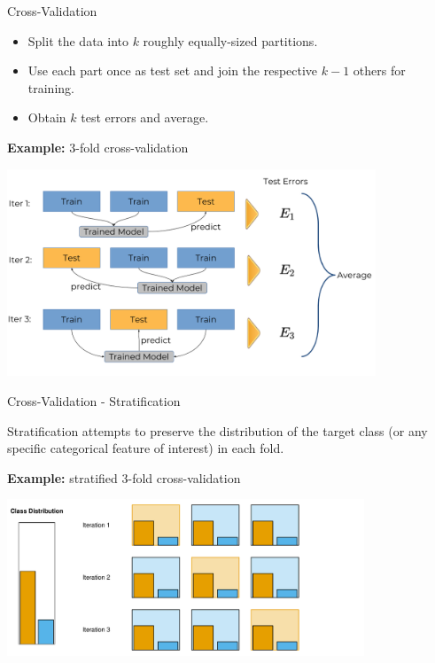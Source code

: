 \documentclass[11pt,compress,t,notes=noshow, xcolor=table]{beamer}
\newenvironment{knitrout}{}{} %
\begin{document}
\begin{vbframe}{Cross-Validation}

\begin{itemize}
  \item Split the data into $k$ roughly equally-sized partitions.
  \item Use each part once as test set and join the respective $k-1$ others for 
  training.
  \item Obtain $k$ test errors and average.
\end{itemize}

\lz

\textbf{Example:} 3-fold cross-validation

\begin{center}
\includegraphics[width=11cm]{figure_man/crossvalidation.png}
\end{center}
\end{vbframe}

\begin{vbframe}{Cross-Validation - Stratification}

Stratification attempts to preserve the distribution of the target class (or any 
specific categorical feature of interest) in each fold.

\lz

\textbf{Example:} stratified 3-fold cross-validation

\lz

\begin{knitrout}\scriptsize
{}\color{fgcolor}

{\centering \includegraphics[width=0.8\textwidth]{figure/eval_resample_1} 

}

\end{knitrout}
\end{vbframe}
\end{document}
